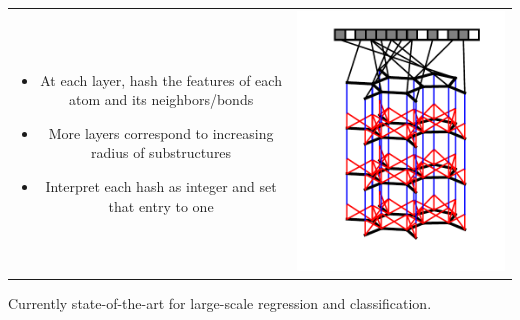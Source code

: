 \documentclass[landscape,a0b,final,a4resizeable]{include/a0poster}
\begin{document}
\begin{poster}
\begin{multicols}{3}
\begin{tabular}{cc}
\begin{minipage}[c]{0.5\columnwidth}
\begin{itemize}
  \item At each layer, hash the features of each atom and its neighbors/bonds
  \item More layers correspond to increasing radius of substructures
  \item Interpret each hash as integer and set that entry to one
\end{itemize}
\end{minipage} & 
\begin{minipage}[c]{0.5\columnwidth}
\centerline{\includegraphics[width=0.9\columnwidth, clip, trim=4mm 12mm 4mm 4mm]{figures/fig_1}}
\end{minipage}
\end{tabular}

\vspace{0.5in}

Currently state-of-the-art for large-scale regression and classification.



\newpage %



\end{multicols}
\end{poster}
\end{document}
